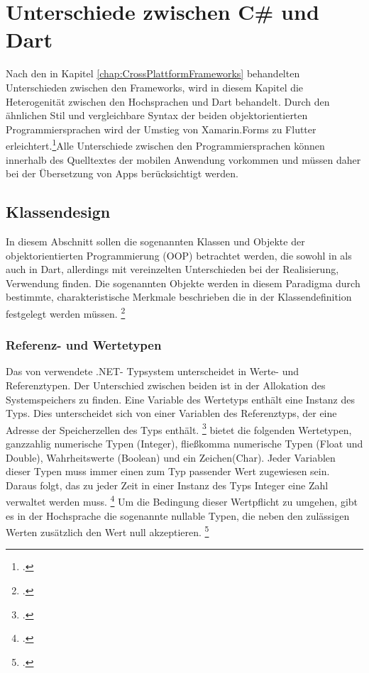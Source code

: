 \chapter{Unterschiede zwischen C\# und Dart}
\label{chap:Programmiersprachen}

Nach den in Kapitel \ref{chap:CrossPlattformFrameworks} behandelten Unterschieden zwischen den Frameworks, wird in diesem Kapitel die Heterogenität zwischen den Hochsprachen \Csharp und Dart behandelt.  Durch den ähnlichen Stil und vergleichbare Syntax der beiden objektorientierten Programmiersprachen wird der Umstieg von Xamarin.Forms zu Flutter erleichtert.\footcite[Vgl. ][Abgerufen am \today]{Pedley2019}Alle Unterschiede zwischen den Programmiersprachen können innerhalb des Quelltextes der mobilen Anwendung vorkommen und müssen daher bei der Übersetzung von Apps berücksichtigt werden.

\section{Klassendesign}
In diesem Abschnitt sollen die sogenannten Klassen und Objekte der objektorientierten Programmierung (OOP) betrachtet werden, die sowohl in \Csharp als auch in Dart, allerdings mit vereinzelten Unterschieden bei der Realisierung, Verwendung finden. Die sogenannten Objekte werden in diesem Paradigma durch bestimmte,  charakteristische Merkmale beschrieben  die in der Klassendefinition festgelegt werden müssen. \footcite[Vgl.][S. 11f.]{Witte2013}

\subsection{Referenz- und Wertetypen}

Das von \Csharp verwendete .NET- Typsystem unterscheidet in Werte- und Referenztypen.  Der Unterschied zwischen beiden ist in der Allokation des Systemspeichers zu finden.  Eine Variable des Wertetyps enthält eine Instanz des Typs.  Dies unterscheidet sich von einer Variablen des Referenztyps, der eine Adresse der Speicherzellen des Typs enthält. \footcite[Vgl.][S. 155f.]{Kühnel2019} \Csharp bietet die folgenden Wertetypen,  ganzzahlig numerische Typen (Integer),  fließkomma numerische Typen (Float und Double),  Wahrheitswerte (Boolean) und ein Zeichen(Char).  Jeder Variablen dieser Typen muss immer einen zum Typ passender Wert zugewiesen sein.  Daraus folgt,  das zu jeder Zeit in einer Instanz des Typs Integer eine Zahl verwaltet werden muss. \footcite[Vgl. ][Abgerufen am \today]{MicrosoftValueTypes2020} Um die Bedingung dieser Wertpflicht zu umgehen,  gibt es in der Hochsprache \Csharp die sogenannte \glq nullable\grq{} Typen,  die neben den zulässigen Werten zusätzlich den Wert \glq null\grq{} akzeptieren. \footcite[Vgl.][S. 167]{Bayer2008} 


